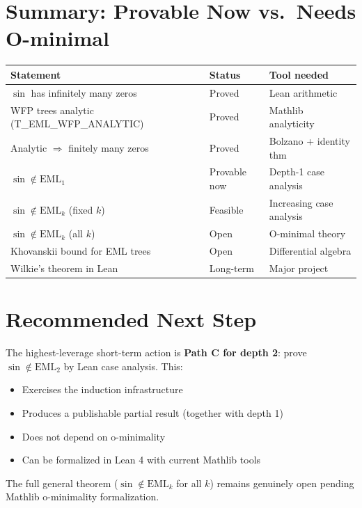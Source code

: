 \documentclass[12pt]{article}
\begin{document}
\section{Summary: Provable Now vs.\ Needs O-minimal}

\begin{center}
\begin{tabular}{lll}
\toprule
Statement & Status & Tool needed \\
\midrule
$\sin$ has infinitely many zeros & \textcolor{proved}{Proved} & Lean arithmetic \\
WFP trees analytic (T\_EML\_WFP\_ANALYTIC) & \textcolor{proved}{Proved} & Mathlib analyticity \\
Analytic $\Rightarrow$ finitely many zeros & \textcolor{proved}{Proved} & Bolzano + identity thm \\
$\sin \notin \mathrm{EML}_1$ & \textcolor{proved}{Provable now} & Depth-1 case analysis \\
$\sin \notin \mathrm{EML}_k$ (fixed $k$) & \textcolor{partial}{Feasible} & Increasing case analysis \\
$\sin \notin \mathrm{EML}_k$ (all $k$) & \textcolor{open}{Open} & O-minimal theory \\
Khovanskii bound for EML trees & \textcolor{open}{Open} & Differential algebra \\
Wilkie's theorem in Lean & \textcolor{open}{Long-term} & Major project \\
\bottomrule
\end{tabular}
\end{center}

\section{Recommended Next Step}

The highest-leverage short-term action is \textbf{Path C for depth 2}: prove
$\sin \notin \mathrm{EML}_2$ by Lean case analysis. This:
\begin{itemize}[noitemsep]
  \item Exercises the induction infrastructure
  \item Produces a publishable partial result (together with depth 1)
  \item Does not depend on o-minimality
  \item Can be formalized in Lean 4 with current Mathlib tools
\end{itemize}

The full general theorem ($\sin \notin \mathrm{EML}_k$ for all $k$) remains genuinely
open pending Mathlib o-minimality formalization.
\end{document}
